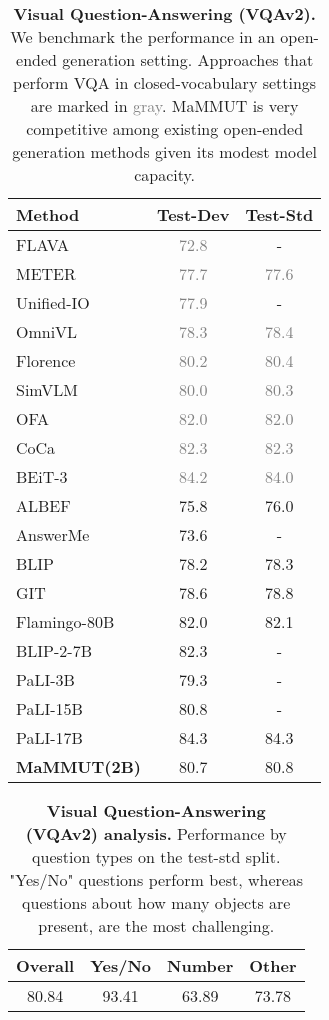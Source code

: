 \documentclass[10pt]{article} \usepackage[accepted]{tmlr}
\newcommand{\gray}[1]{\textcolor{gray}{{#1}}}
\newcommand{\ours}{MaMMUT\xspace}
\begin{document}
\begin{table}[t]
\centering
\small
\begin{tabular}{l|c|c}
Method & Test-Dev & Test-Std \\ 
\hline
FLAVA~\citep{singh2022flava} & \gray{72.8} & - \\
METER~\citep{meter} & \gray{77.7} & \gray{77.6} \\
Unified-IO~\citep{UnifiedIO} & \gray{77.9} &- \\
OmniVL~\citep{omniVL} & \gray{78.3} & \gray{78.4} \\
Florence~\citep{yuan2021florence} & \gray{80.2} & \gray{80.4} \\
SimVLM~\citep{yu2022coca} & \gray{80.0} & \gray{80.3} \\
OFA~\citep{wang2022unifying} & \gray{82.0} & \gray{82.0} \\
CoCa~\citep{yu2022coca} & \gray{82.3} & \gray{82.3} \\
BEiT-3~\citep{yu2022coca} & \gray{84.2} & \gray{84.0} \\
\hline
ALBEF~\citep{albef}  & 75.8 & 76.0 \\
AnswerMe~\citep{piergiovanni2022answer} & 73.6 & - \\
BLIP~\citep{li2022blip}  & 78.2 & 78.3 \\      
GIT~\citep{wang2022git}  & 78.6 & 78.8 \\
Flamingo-80B~\citep{flamingo} & 82.0 &  82.1 \\
BLIP-2-7B~\citep{Li2023BLIP2BL} & 82.3 &  - \\
PaLI-3B~\citep{pali}   & 79.3 & - \\
PaLI-15B~\citep{pali}   & 80.8 & - \\
PaLI-17B~\citep{pali}   & 84.3 & 84.3 \\
\hline
\bf{\ours (2B)} & 80.7 & 80.8 \\
\hline
\end{tabular}
\caption{\textbf{Visual Question-Answering (VQAv2).} We benchmark the performance in an open-ended generation setting. Approaches that perform VQA in closed-vocabulary settings are marked in \gray{gray}. \ours is very competitive among existing open-ended generation methods given its modest model capacity.
}
\label{tab:results_vqa}
\end{table}


\begin{table}\centering
\small
\begin{tabular}{c|ccc}
Overall &Yes/No & Number & Other \\ 
\hline
80.84 & 93.41 & 63.89 & 73.78 \\
\hline
\end{tabular}
\vspace{-1mm}
\caption{\textbf{Visual Question-Answering (VQAv2) analysis.} Performance by question types on the test-std split. "Yes/No" questions perform best, whereas questions about how many objects are present, are the most challenging.
}
\vspace{-5mm}
\label{tab:results_vqa_analysis}
\end{table}
\end{document}
